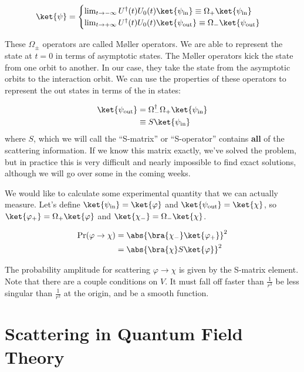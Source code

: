 \documentclass[a4paper,twoside,master.tex]{subfiles}
\begin{document}
\begin{equation}
    \ket{\psi} = \begin{cases} \lim_{t \to - \infty} U^\dagger(t) U_0(t)\ket{\psi_{\text{in}}} \equiv \Omega_+\ket{\psi_{\text{in}}}\\ \lim_{t \to + \infty} U^\dagger(t) U_0(t)\ket{\psi_{\text{out}}} \equiv \Omega_-\ket{\psi_{\text{out}}}\end{cases} 
\end{equation}

These $ \Omega_{\pm} $ operators are called M\o{}ller operators. We are able to represent the state at $ t = 0 $ in terms of asymptotic states. The M\o{}ller operators kick the state from one orbit to another. In our case, they take the state from the asymptotic orbits to the interaction orbit. We can use the properties of these operators to represent the out states in terms of the in states:

\begin{align}
    \ket{\psi_{\text{out}}} &= \Omega_-^\dagger \Omega_+\ket{\psi_{\text{in}}} \\
    &\equiv S\ket{\psi_{\text{in}}}
\end{align}
where $ S $, which we will call the ``S-matrix'' or ``S-operator'' contains \textbf{all} of the scattering information. If we know this matrix exactly, we've solved the problem, but in practice this is very difficult and nearly impossible to find exact solutions, although we will go over some in the coming weeks.


We would like to calculate some experimental quantity that we can actually measure. Let's define $\ket{\psi_{\text{in}}} =\ket{\varphi} $ and $\ket{\psi_{\text{out}}} =\ket{\chi} $, so $\ket{\varphi_+} = \Omega_+\ket{\varphi} $ and $\ket{\chi_-} = \Omega_-\ket{\chi} $.

\begin{align}
    \Pr(\varphi \to \chi) &= \abs{\bra{\chi_-}\ket{\varphi_+}}^2 \\
    &= \abs{\bra{\chi} S\ket{\varphi}}^2
\end{align}

The probability amplitude for scattering $ \varphi \to \chi $ is given by the S-matrix element. Note that there are a couple conditions on $ V $. It must fall off faster than $ \frac{1}{r^3} $ be less singular than $ \frac{1}{r^2} $ at the origin, and be a smooth function.

\section{Scattering in Quantum Field Theory}
\label{sec:scattering_in_quantum_field_theory}
\end{document}
